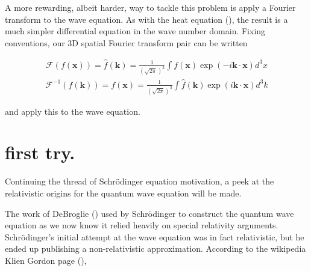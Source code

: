 \documentclass[]{eliblog}
\newcommand{\Bk}[0]{\mathbf{k}}
\newcommand{\Bx}[0]{\mathbf{x}}
\newcommand{\inv}[1]{\frac{1}{#1}}
\newcommand{\FF}[0]{\mathcal{F}}
\begin{document}
A more rewarding, albeit harder, way to tackle this problem is apply a Fourier transform to the wave equation.  As with the heat equation
(\cite{osgoodFourier}), the result is a much simpler differential equation in the wave number domain.
Fixing conventions, our 3D spatial Fourier transform pair can be written

\begin{align}
\FF(f(\Bx)) = \hat{f}(\Bk) = \inv{(\sqrt{2\pi})^3} \int f(\Bx) \exp\left( -i \Bk \cdot \Bx \right) d^3 x 
\end{align}
\begin{align}
\FF^{-1}({f}(\Bk)) = f(\Bx) = \inv{(\sqrt{2\pi})^3} \int \hat{f}(\Bk) \exp\left( i \Bk \cdot \Bx \right) d^3 k
\end{align}

and apply this to the wave equation.

%
%

\section{first try.}
Continuing the thread of Schr\"{o}dinger equation motivation, a peek at the relativistic origins for the quantum wave equation will be made.

The work of DeBroglie (\cite{AFkracklauerDeBroglie}) used by Schr\"{o}dinger to construct the quantum wave equation as we now know it relied heavily on special relativity arguments.  
Schr\"{o}dinger's initial attempt at the wave equation was in fact relativistic, but he ended up publishing a non-relativistic 
approximation.
According to the wikipedia Klien Gordon page (\cite{wikiKG}), 



%
%
\end{document}
